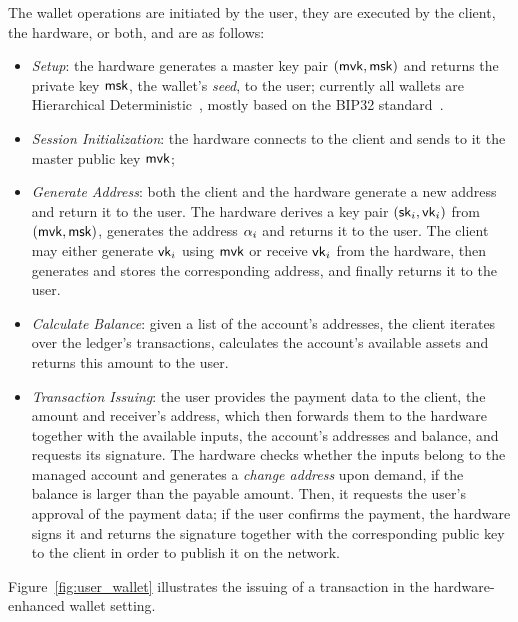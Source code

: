The wallet operations are initiated by the user, they are executed by the
client, the hardware, or both, and are as follows:
\begin{itemize}
    \item \emph{Setup}: the hardware generates a master key pair
        $(\mathsf{mvk}, \mathsf{msk})$ and returns the private key $\mathsf{msk}$, \ie the
        wallet's \emph{seed}, to the user; currently all wallets are
        Hierarchical Deterministic~\cite{CCS:DasFauLos19}, mostly based on the
        BIP32 standard~\cite{bip32}.
    \item  \emph{Session Initialization}: the hardware connects to the client
        and sends to it the master public key $\mathsf{mvk}$;
    \item \emph{Generate Address}: both the client and the hardware generate a
        new address and return it to the user. The hardware derives a key
        pair $(\mathsf{sk}_i, \mathsf{vk}_i)$ from $(\mathsf{mvk}, \mathsf{msk})$, generates the
        address $\alpha_i$ and returns it to the user. The client may either
        generate $\mathsf{vk}_i$ using $\mathsf{mvk}$ or receive $\mathsf{vk}_i$ from
        the hardware, then generates and stores the corresponding address, and
        finally returns it to the user.
    \item \emph{Calculate Balance}: given a list of the account's addresses,
        the client iterates over the ledger's transactions, calculates the
        account's available assets and returns this amount to the user.
    \item \emph{Transaction Issuing}: the user provides the payment data to the
        client, \ie the amount and receiver's address, which then forwards them
        to the hardware together with the available inputs, \ie the account's
        addresses and balance, and requests its signature. The hardware checks
        whether the inputs belong to the managed account and generates a
        \emph{change address} upon demand, \ie if the balance is larger than
        the payable amount. Then, it requests the user's approval of the
        payment data; if the user confirms the payment, the hardware signs it
        and returns the signature together with the corresponding public key to
        the client in order to publish it on the network.
\end{itemize}
Figure~\ref{fig:user_wallet} illustrates the issuing of a transaction in the
hardware-enhanced wallet setting.

